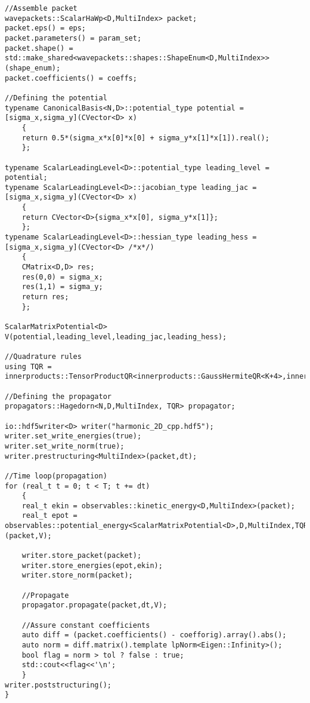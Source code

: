 \begin{lstlisting}
//Assemble packet
wavepackets::ScalarHaWp<D,MultiIndex> packet;
packet.eps() = eps;
packet.parameters() = param_set;
packet.shape() = std::make_shared<wavepackets::shapes::ShapeEnum<D,MultiIndex>>(shape_enum);
packet.coefficients() = coeffs;

//Defining the potential
typename CanonicalBasis<N,D>::potential_type potential = [sigma_x,sigma_y](CVector<D> x)
	{
    return 0.5*(sigma_x*x[0]*x[0] + sigma_y*x[1]*x[1]).real();
	};
	
typename ScalarLeadingLevel<D>::potential_type leading_level = potential;
typename ScalarLeadingLevel<D>::jacobian_type leading_jac = [sigma_x,sigma_y](CVector<D> x) 
    {
    return CVector<D>{sigma_x*x[0], sigma_y*x[1]};
    };
typename ScalarLeadingLevel<D>::hessian_type leading_hess = [sigma_x,sigma_y](CVector<D> /*x*/)
    {
    CMatrix<D,D> res;
    res(0,0) = sigma_x;
    res(1,1) = sigma_y;
    return res;
    };

ScalarMatrixPotential<D> V(potential,leading_level,leading_jac,leading_hess);

//Quadrature rules
using TQR = innerproducts::TensorProductQR<innerproducts::GaussHermiteQR<K+4>,innerproducts::GaussHermiteQR<K+4>>;

//Defining the propagator
propagators::Hagedorn<N,D,MultiIndex, TQR> propagator;

io::hdf5writer<D> writer("harmonic_2D_cpp.hdf5");
writer.set_write_energies(true);
writer.set_write_norm(true);
writer.prestructuring<MultiIndex>(packet,dt);

//Time loop(propagation)
for (real_t t = 0; t < T; t += dt) 
	{
    real_t ekin = observables::kinetic_energy<D,MultiIndex>(packet);
    real_t epot = observables::potential_energy<ScalarMatrixPotential<D>,D,MultiIndex,TQR>(packet,V);

	writer.store_packet(packet);
    writer.store_energies(epot,ekin);
    writer.store_norm(packet);
    	
    //Propagate
    propagator.propagate(packet,dt,V);

    //Assure constant coefficients
    auto diff = (packet.coefficients() - coefforig).array().abs();
    auto norm = diff.matrix().template lpNorm<Eigen::Infinity>();
    bool flag = norm > tol ? false : true;
    std::cout<<flag<<'\n';
    }
writer.poststructuring();
}
\end{lstlisting}
